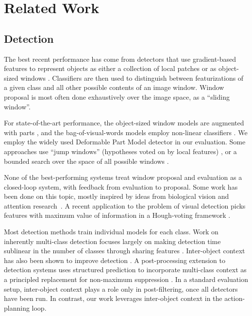 \section{Related Work}\label{sec:related_work}

\subsection{Detection}

The best recent performance has come from detectors that use gradient-based features to represent objects as either a collection of local patches or as object-sized windows \cite{Dalal2005,Lowe2004}.
Classifiers are then used to distinguish between featurizations of a given class and all other possible contents of an image window.
Window proposal is most often done exhaustively over the image space, as a ``sliding window''.

For state-of-the-art performance, the object-sized window models are augmented with parts \cite{Felzenszwalb2010a}, and the bag-of-visual-words models employ non-linear classifiers \cite{Vedaldi2009}.
We employ the widely used Deformable Part Model detector \cite{Felzenszwalb2010a} in our evaluation.
Some approaches use ``jump windows'' (hypotheses voted on by local features) \cite{Vedaldi2009,Vijayanarasimhan2011}, or a bounded search over the space of all possible windows \cite{Lampert2008a}.

None of the best-performing systems treat window proposal and evaluation as a closed-loop system, with feedback from evaluation to proposal.
Some work has been done on this topic, mostly inspired by ideas from biological vision and attention research~\cite{Butko2009,Vogel2008}.
A recent application to the problem of visual detection picks features with maximum value of information in a Hough-voting framework \cite{Vijayanarasimhan2010}.

Most detection methods train individual models for each class.
Work on inherently multi-class detection focuses largely on making detection time sublinear in the number of classes through sharing features \cite{Torralba2007,Fan2005}.
Inter-object context has also been shown to improve detection \cite{Torralba2004}.
A post-processing extension to detection systems uses structured prediction to incorporate multi-class context as a principled replacement for non-maximum suppression \cite{Desai2009}.
In a standard evaluation setup, inter-object context plays a role only in post-filtering, once all detectors have been run.
In contrast, our work leverages inter-object context in the action-planning loop.

